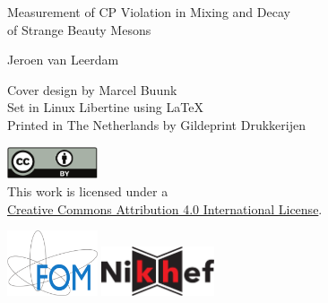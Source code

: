 \thispagestyle{empty}
\begin{center}

  {\Large
  Measurement of CP Violation in Mixing and Decay\\
  of Strange Beauty Mesons}




  {\large
  Jeroen van Leerdam}

\end{center}

\newpage
\thispagestyle{empty}

\begin{center}
  Cover design by Marcel Buunk \\

  Set in Linux Libertine using \LaTeX \\
  Printed in The Netherlands by Gildeprint Drukkerijen\\


  \href{http://creativecommons.org/licenses/by/4.0/}{\includegraphics[width=0.2\textwidth]{graphics/title/cc_by_cmyk}}\\
  This work is licensed under a\\
  \href{http://creativecommons.org/licenses/by/4.0/}{Creative Commons Attribution 4.0 International License}.

\end{center}


\noindent%
\hspace*{0.05\textwidth}%
\href{http://www.fom.nl/}{\includegraphics[width=0.20\textwidth]{graphics/title/FOMlogo_fc-crop-cmyk}}%
%
\href{http://www.nikhef.nl/}{\includegraphics[width=0.25\textwidth]{graphics/title/NikhefLogoOutline_cmyk}}%
\hspace*{0.05\textwidth}\\
\vspace*{-0.02\textwidth}

